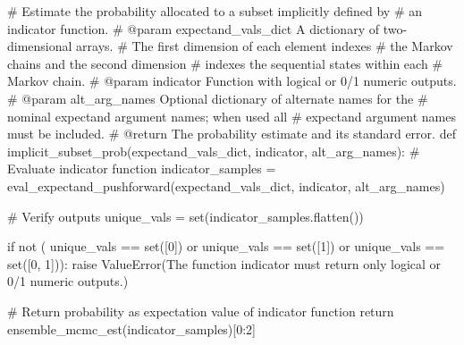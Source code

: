 \documentclass[
  letterpaper,
  DIV=11,
  numbers=noendperiod]{scrartcl}
\newenvironment{Shaded}{\begin{snugshade}}{\end{snugshade}}
\newcommand{\BuiltInTok}[1]{\textcolor[rgb]{0.00,0.23,0.31}{#1}}
\newcommand{\CommentTok}[1]{\textcolor[rgb]{0.37,0.37,0.37}{#1}}
\newcommand{\ControlFlowTok}[1]{\textcolor[rgb]{0.00,0.23,0.31}{#1}}
\newcommand{\DecValTok}[1]{\textcolor[rgb]{0.68,0.00,0.00}{#1}}
\newcommand{\KeywordTok}[1]{\textcolor[rgb]{0.00,0.23,0.31}{#1}}
\newcommand{\NormalTok}[1]{\textcolor[rgb]{0.00,0.23,0.31}{#1}}
\newcommand{\OperatorTok}[1]{\textcolor[rgb]{0.37,0.37,0.37}{#1}}
\newcommand{\PreprocessorTok}[1]{\textcolor[rgb]{0.68,0.00,0.00}{#1}}
\newcommand{\StringTok}[1]{\textcolor[rgb]{0.13,0.47,0.30}{#1}}
\begin{document}
\begin{Shaded}
\begin{Highlighting}[]
\CommentTok{\# Estimate the probability allocated to a subset implicitly defined by}
\CommentTok{\# an indicator function.}
\CommentTok{\# @param expectand\_vals\_dict A dictionary of two{-}dimensional arrays.}
\CommentTok{\#                            The first dimension of each element indexes}
\CommentTok{\#                            the Markov chains and the second dimension}
\CommentTok{\#                            indexes the sequential states within each}
\CommentTok{\#                            Markov chain.}
\CommentTok{\# @param indicator Function with logical or 0/1 numeric outputs.}
\CommentTok{\# @param alt\_arg\_names Optional dictionary of alternate names for the}
\CommentTok{\#                      nominal expectand argument names; when used all}
\CommentTok{\#                      expectand argument names must be included.}
\CommentTok{\# @return The probability estimate and its standard error.}
\KeywordTok{def}\NormalTok{ implicit\_subset\_prob(expectand\_vals\_dict,}
\NormalTok{                         indicator,}
\NormalTok{                         alt\_arg\_names):}
  \CommentTok{\# Evaluate indicator function}
\NormalTok{  indicator\_samples }\OperatorTok{=}\NormalTok{ eval\_expectand\_pushforward(expectand\_vals\_dict,}
\NormalTok{                                                 indicator,}
\NormalTok{                                                 alt\_arg\_names)}

  \CommentTok{\# Verify outputs}
\NormalTok{  unique\_vals }\OperatorTok{=} \BuiltInTok{set}\NormalTok{(indicator\_samples.flatten())}

  \ControlFlowTok{if} \KeywordTok{not}\NormalTok{ (   unique\_vals }\OperatorTok{==} \BuiltInTok{set}\NormalTok{([}\DecValTok{0}\NormalTok{])}
          \KeywordTok{or}\NormalTok{ unique\_vals }\OperatorTok{==} \BuiltInTok{set}\NormalTok{([}\DecValTok{1}\NormalTok{])}
          \KeywordTok{or}\NormalTok{ unique\_vals }\OperatorTok{==} \BuiltInTok{set}\NormalTok{([}\DecValTok{0}\NormalTok{, }\DecValTok{1}\NormalTok{])):}
    \ControlFlowTok{raise} \PreprocessorTok{ValueError}\NormalTok{(}\StringTok{\textquotesingle{}The function \textasciigrave{}indicator\textasciigrave{} must return only \textquotesingle{}}
                     \StringTok{\textquotesingle{}logical or 0/1 numeric outputs.\textquotesingle{}}\NormalTok{)}

  \CommentTok{\# Return probability as expectation value of indicator function}
  \ControlFlowTok{return}\NormalTok{ ensemble\_mcmc\_est(indicator\_samples)[}\DecValTok{0}\NormalTok{:}\DecValTok{2}\NormalTok{]}
\end{Highlighting}
\end{Shaded}
\end{document}
